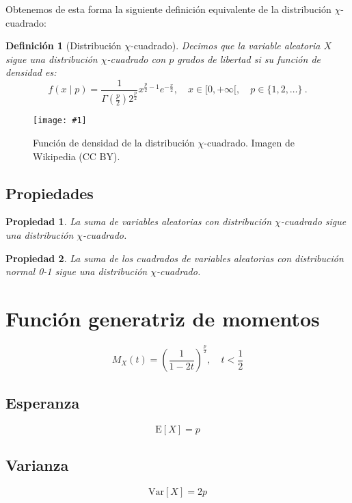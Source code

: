 \documentclass[a4paper, 10pt]{article} %
\newcommand{\figura}[2]{\begin{figure}[hbtp]\centering \texttt{[image: \#1]} \caption{#2} \end{figure}}
\newtheorem{definition}{Definición}[section]
\newtheorem{property}{Propiedad}[section]
\begin{document}
Obtenemos de esta forma la siguiente definición equivalente de la distribución $\chi$-cuadrado:
\begin{definition}[Distribución $\chi$-cuadrado]
  Decimos que la variable aleatoria $X$ sigue una distribución $\chi$-cuadrado con $p$ grados de libertad si su función de densidad es:
  $$f(x\mid p) = \frac 1 {\Gamma(\frac p 2)2^{\frac p 2}}x^{\frac p 2-1}e^{-\frac x 2},\quad x\in[0,+\infty[,\quad p\in\{1,2,\dots\}~.$$
\end{definition}

\figura{pdf.png}{Función de densidad de la distribución $\chi$-cuadrado. Imagen de Wikipedia (CC BY).}

\subsection{Propiedades}

\begin{property}
  La suma de variables aleatorias con distribución $\chi$-cuadrado sigue una distribución $\chi$-cuadrado.
\end{property}

\begin{property}
  La suma de los cuadrados de variables aleatorias con distribución normal 0-1 sigue una distribución $\chi$-cuadrado.
\end{property}

\section{Función generatriz de momentos}
$$M_X(t)=\left(\frac 1 {1 - 2t}\right)^{\frac p 2},\quad t<\frac 1 2$$

\subsection{Esperanza}
$$\mathrm E[X]=p$$

\subsection{Varianza}
$$\mathrm{Var}[X]=2p$$
\end{document}
